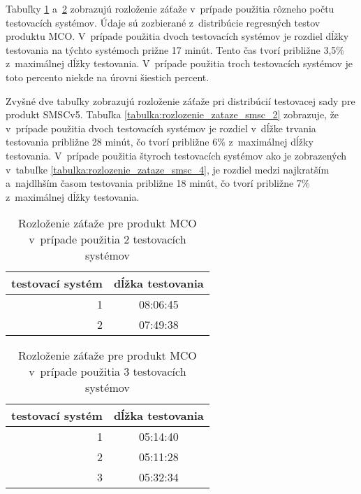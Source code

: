 Tabuľky \ref{tabulka:rozlozenie_zataze_mco_2} a~\ref{tabulka:rozlozenie_zataze_mco_3} 
zobrazujú rozloženie záťaže v~prípade
použitia rôzneho počtu testovacích systémov. Údaje sú zozbierané
z~distribúcie regresných testov produktu MCO. V~prípade použitia
dvoch testovacích systémov je rozdiel dĺžky testovania na týchto systémoch
prižne 17 minút. Tento čas tvorí približne 3,5\% z~maximálnej dĺžky testovania.
V~prípade použitia troch testovacích systémov je toto percento niekde 
na úrovni šiestich percent.
 
Zvyšné dve tabuľky zobrazujú rozloženie záťaže pri distribúcií testovacej
sady pre produkt SMSCv5. Tabuľka \ref{tabulka:rozlozenie_zataze_smsc_2} 
zobrazuje, že v~prípade použitia dvoch testovacích systémov je rozdiel
v~dĺžke trvania testovania približne 28 minút, čo tvorí približne 6\%
z~maximálnej dĺžky testovania. V~prípade použitia štyroch
testovacích systémov ako je zobrazených v~tabuľke \ref{tabulka:rozlozenie_zataze_smsc_4},
je rozdiel medzi najkratším a~najdlhším časom testovania približne 18 minút, čo
tvorí približne 7\% z~maximálnej dĺžky testovania.



\begin{table}[h!]
  \begin{center}
    \begin{tabular}{ | r | c | }
      \hline
      testovací systém & dĺžka testovania \\ \hline
      1  & 08:06:45  \\ \hline
      2  & 07:49:38  \\ \hline 
    \end{tabular}
    \caption{Rozloženie záťaže pre produkt MCO v~prípade použitia 2 
             testovacích systémov}
    \label{tabulka:rozlozenie_zataze_mco_2}
  \end{center}
\end{table}

\begin{table}[h!]
  \begin{center}
    \begin{tabular}{ | r | c | }
      \hline
      testovací systém & dĺžka testovania \\ \hline
      1  & 05:14:40  \\ \hline
      2  & 05:11:28  \\ \hline 
      3  & 05:32:34  \\ \hline 
    \end{tabular}
    \caption{Rozloženie záťaže pre produkt MCO v~prípade použitia 3 
             testovacích systémov}
    \label{tabulka:rozlozenie_zataze_mco_3}
  \end{center}
\end{table}


